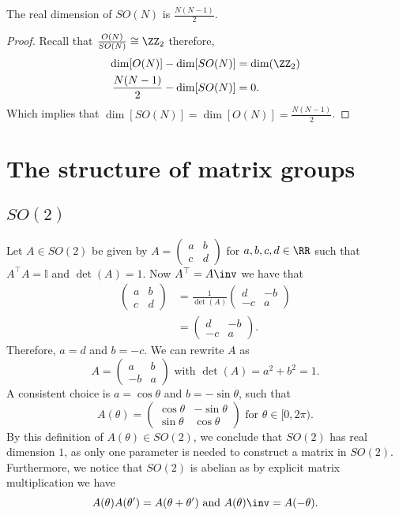 \documentclass[12pt, a4paper]{article}
\begin{document}
\begin{mdthm}
    The real dimension of \(SO(N)\) is \(\frac{N(N-1)}{2}\).
\end{mdthm}

\begin{proof}
    Recall that \(\frac{O(N)}{SO(N)} \cong \ZZ_2\) therefore,
    \[\begin{aligned}
        \dim[O(N)]-\dim[SO(N)]&=\dim(\ZZ_2) \\
        \frac{N(N-1)}{2} - \dim[SO(N)] &=0.
    \end{aligned}\]
    Which implies that \(\dim[SO(N)]=\dim[O(N)]=\frac{N(N-1)}{2}\).
\end{proof}

\pagebreak

\section{The structure of matrix groups}

\subsection{\texorpdfstring{\(SO(2)\)}{TEXT}}

Let \(A \in SO(2)\) be given by \(A=\begin{pmatrix} a & b \\ c & d  \end{pmatrix}\) for \(a,b,c,d \in \RR\) such that \(A^{\top}A =\mathbb{I}\) and \(\det(A)=1\). Now \(A^{\top}=A\inv\) we have that
\[\begin{aligned}
    \begin{pmatrix} a & b \\ c & d  \end{pmatrix} &= \frac{1}{\det(A)}\begin{pmatrix} d & -b \\ -c & a  \end{pmatrix} \\
    &= \begin{pmatrix} d & -b \\ -c & a  \end{pmatrix}.
\end{aligned}\]
Therefore, \(a=d\) and \(b=-c\). We can rewrite \(A\) as
\[A= \begin{pmatrix} a & b \\ -b & a  \end{pmatrix} \text{ with } \det(A)=a^2+b^2=1.\]
A consistent choice is \(a=\cos\theta\) and \(b=-\sin\theta\), such that
\[A(\theta)=\begin{pmatrix} \cos\theta & -\sin\theta \\ \sin\theta & \cos\theta  \end{pmatrix}  \text{ for } \theta \in [0,2\pi).\]
By this definition of \(A(\theta) \in SO(2)\), we conclude that \(SO(2)\) has real dimension \(1\), as only one parameter is needed to construct a matrix in \(SO(2)\). Furthermore, we notice that \(SO(2)\) is abelian as by explicit matrix multiplication we have
\[A(\theta)A(\theta')=A(\theta+\theta') \text{ and } A(\theta)\inv =A(-\theta).\]
\end{document}
